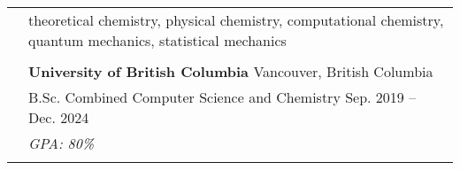 \documentclass[letterpaper, 11pt]{article}
\begin{document}

\vspace{0.5cm}


\setlength{\tabcolsep}{8pt}

\begin{longtable}{p{1.3in}p{4.8in}}

	\nohyphens{\color{Blue}{Research Interests}}
	 & theoretical chemistry, physical chemistry, computational chemistry, quantum mechanics, statistical mechanics                                                                                           \\
	 &                                                                                                                                                                                                        \\

	\color{Blue}{Education}
	 & \textbf{University of British Columbia} \hfill Vancouver, British Columbia                                                                                                                             \\
	 & B.Sc. Combined Computer Science and Chemistry \hfill Sep. 2019 -- Dec. 2024                                                                                                                            \\
	 & {\it GPA: 80\%}                                                                                                                                                                                        \\
	 &                                                                                                                                                                                                        \\


\end{longtable}
\end{document}
